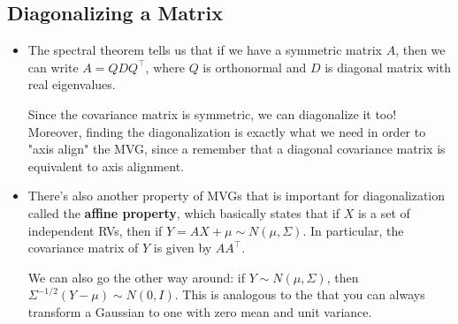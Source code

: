 \subsection{Diagonalizing a Matrix}
\begin{itemize}
	\item The spectral theorem tells us that if we have a symmetric matrix \( A \),
		then we can write \( A = QDQ^{\top} \), where \( Q \) is orthonormal and \( D
		\) is diagonal matrix with real eigenvalues. 

		Since the covariance matrix is symmetric, we can diagonalize it too!
		Moreover, finding the diagonalization is exactly what we need in order to
		"axis align" the MVG, since a remember that a diagonal covariance matrix
		is equivalent to axis alignment.  
	\item There's also another property of MVGs that is important for diagonalization
		called the \textbf{affine property}, which basically states that if \( X \)
		is a set of independent RVs, then if \( Y = AX + \mu \sim N(\mu, \Sigma)\).
		In particular, the covariance matrix of \( Y \) is given by \( A A^{\top}
		\). 

		We can also go the other way around: if \( Y \sim N(\mu, \Sigma) \), then \(
		\Sigma^{- 1 / 2}(Y - \mu) \sim N(0, I)\). This is analogous to the that you
		can always transform a Gaussian to one with zero mean and unit variance.  
\end{itemize}
